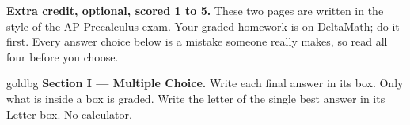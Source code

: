 \documentclass[10pt]{article}
\begin{document}

\vspace{0.12in}

\boxguard[8]
\begin{remindbox}
\small
\textbf{Extra credit, optional, scored 1 to 5.} These two pages are written in the style of the AP
Precalculus exam. Your graded homework is on DeltaMath; do it first. Every
answer choice below is a mistake someone really makes, so read all four before you choose.
\end{remindbox}

\vspace{0.12in}

\begin{headlinebox}{goldbg}
\small
\textbf{Section I --- Multiple Choice.} Write each final answer in its box. Only what is inside
a box is graded. Write the letter of the single best answer in its Letter box. No calculator.
\end{headlinebox}

\vspace{0.06in}
\end{document}

